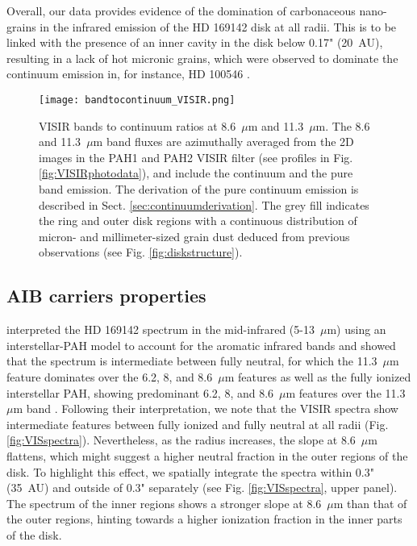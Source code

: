 \documentclass{aa}
\newcommand{\mic}{~$\mu$m\xspace}
\begin{document}
Overall, our data provides evidence of the domination of carbonaceous nano-grains in the infrared emission of the HD 169142 disk at all radii. This is to be linked with the presence of an inner cavity in the disk below 0.17" (20~AU), resulting in a lack of hot micronic grains, which were observed to dominate the continuum emission in, for instance, HD 100546 \citet{Habart2021}. 


\begin{figure}[!ht]
    \centering
    \texttt{[image: bandtocontinuum\_VISIR.png]}
    \caption{VISIR bands to continuum ratios at 8.6\mic and 11.3\mic. The 8.6 and 11.3\mic band fluxes are azimuthally averaged from the 2D images in the PAH1 and PAH2 VISIR filter (see profiles in Fig. \ref{fig:VISIRphotodata}), and include the continuum and the pure band emission. The derivation of the pure continuum emission is described in Sect. \ref{sec:continuumderivation}. The grey fill indicates the ring and outer disk regions with a continuous distribution of micron- and millimeter-sized grain dust deduced from previous observations (see Fig. \ref{fig:diskstructure}).}
    \label{fig:contratio}
\end{figure}


\subsection{AIB carriers properties} \label{sec:obs_properties}
\citet{Maaskant2014} interpreted the HD 169142 spectrum in the mid-infrared (5-13\mic) using an interstellar-PAH model to account for the aromatic infrared bands and showed that the spectrum is intermediate between fully neutral, for which the 11.3\mic feature dominates over the 6.2, 8, and 8.6\mic features as well as the fully ionized interstellar PAH, showing predominant 6.2, 8, and 8.6\mic features over the 11.3\mic band \citep{Peeters2002}. Following their interpretation, we note that the VISIR spectra show intermediate features between fully ionized and fully neutral at all radii (Fig. \ref{fig:VISspectra}). Nevertheless, as the radius increases, the slope at 8.6\mic flattens, which might suggest a higher neutral fraction in the outer regions of the disk. To highlight this effect, we spatially integrate the spectra within 0.3" (35~AU) and outside of 0.3" separately (see Fig. \ref{fig:VISspectra}, upper panel). The spectrum of the inner regions shows a stronger slope at 8.6\mic than that of the outer regions, hinting towards a higher ionization fraction in the inner parts of the disk. 
\end{document}
